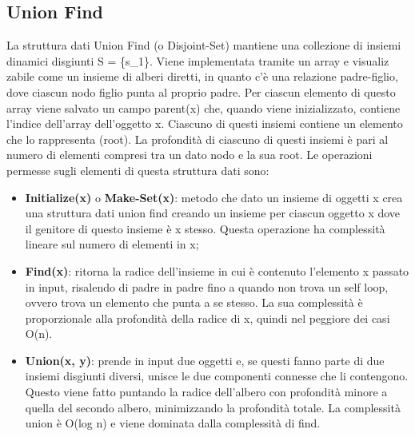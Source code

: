 	\subsection{Union Find}
		La struttura dati Union Find (o Disjoint-Set) mantiene una collezione di insiemi dinamici disgiunti S = \{s\_1\}.
		Viene implementata tramite un array e visualiz zabile come un insieme di alberi diretti, in quanto c'è una relazione padre-figlio, dove ciascun nodo figlio punta al proprio padre.
		Per ciascun elemento di questo array viene salvato un campo parent(x) che, quando viene inizializzato, contiene l'indice dell'array dell'oggetto x.
		Ciascuno di questi insiemi contiene un elemento che lo rappresenta (root).
		La profondità di ciascuno di questi insiemi è pari al numero di elementi compresi tra un dato nodo e la sua root.
		Le operazioni permesse sugli elementi di questa struttura dati sono:
		\begin{itemize}
			\item \textbf{Initialize(x)} o \textbf{Make-Set(x)}: metodo che dato un insieme di oggetti x crea una struttura dati union find creando un insieme per ciascun oggetto x dove il genitore di questo insieme è x stesso. Questa operazione ha complessità lineare sul numero di elementi in x;
			\item \textbf{Find(x)}: ritorna la radice dell'insieme in cui è contenuto l'elemento x passato in input, risalendo di padre in padre fino a quando non trova un self loop, ovvero trova un elemento che punta a se stesso. La sua complessità è proporzionale alla profondità della radice di x, quindi nel peggiore dei casi O(n).
			\item \textbf{Union(x, y)}: prende in input due oggetti e, se questi fanno parte di due insiemi disgiunti diversi, unisce le due componenti connesse che li contengono. Questo viene fatto puntando la radice dell'albero con profondità minore a quella del secondo albero, minimizzando la profondità totale. La complessità union è O(log n) e viene dominata dalla complessità di find.
		\end{itemize}


